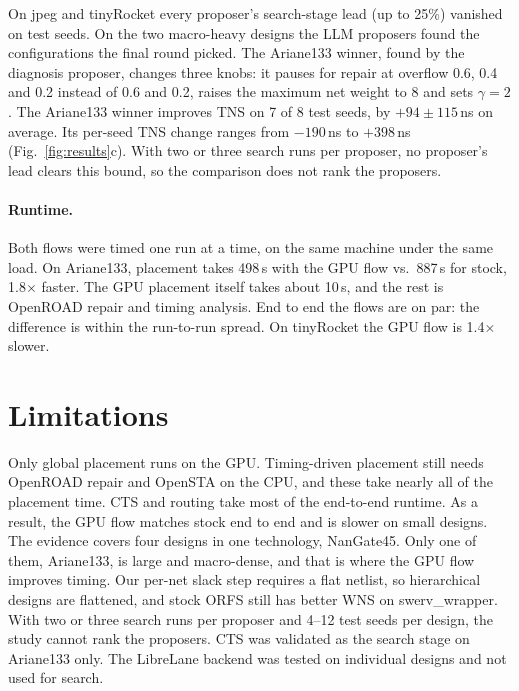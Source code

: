 \documentclass[sigconf]{acmart}
\begin{document}
On jpeg and tinyRocket every proposer's search-stage lead (up to 25\%)
vanished on test seeds. On the two macro-heavy designs the LLM proposers
found the configurations the final round picked. The Ariane133 winner, found by
the diagnosis proposer, changes three knobs: it pauses for repair at overflow
0.6, 0.4 and 0.2 instead of 0.6 and 0.2, raises the maximum net weight to 8
and sets $\gamma = 2$. The Ariane133 winner improves TNS on 7 of 8 test
seeds, by $+94 \pm 115$\,ns on average. Its per-seed TNS change ranges from
$-190$\,ns to $+398$\,ns (Fig.~\ref{fig:results}c). With two or three search
runs per proposer, no proposer's lead clears this bound, so the comparison does
not rank the proposers.

\paragraph{Runtime.}
Both flows were timed one run at a time, on the same machine under the same
load. On Ariane133, placement takes 498\,s with the GPU flow vs.\ 887\,s for
stock, 1.8$\times$ faster. The GPU placement itself takes about 10\,s, and the
rest is OpenROAD repair and timing analysis. End to end the flows are on par:
the difference is within the run-to-run spread. On tinyRocket the GPU flow is
1.4$\times$ slower.

\section{Limitations}
\label{sec:limitations}
Only global placement runs on the GPU. Timing-driven placement still needs
OpenROAD repair and OpenSTA on the CPU, and these take nearly all of the
placement time. CTS and routing take most of the end-to-end runtime. As a
result, the GPU flow matches stock end to end and is slower on small designs.
The evidence covers four designs in one technology, NanGate45. Only one of
them, Ariane133, is large and macro-dense, and that is where the GPU flow
improves timing. Our per-net slack step requires a flat netlist, so
hierarchical designs are flattened, and stock ORFS still has better WNS on
swerv\_wrapper. With two or three search runs per proposer and 4--12 test
seeds per design, the study cannot rank the proposers. CTS was validated as
the search stage on Ariane133 only. The LibreLane backend was tested on
individual designs and not used for search.

\end{document}
